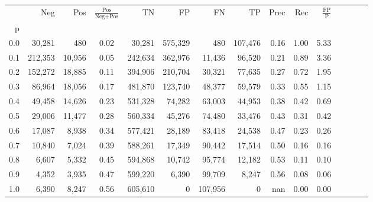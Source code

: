 \begin{tabular}{rrrcrrrrrrrrrrr}
\toprule
{} &      Neg &     Pos & $\frac{\text{Pos}}{\text{Neg}+\text{Pos}}$ &       TN &       FP &       FN &       TP &  Prec &   Rec & $\frac{\text{FP}}{\text{P}}$ \\
p   &          &         &                                            &          &          &          &          &       &       &                              \\
\midrule
0.0 &   30,281 &     480 &                                       0.02 &   30,281 &  575,329 &      480 &  107,476 &  0.16 &  1.00 &                         5.33 \\
0.1 &  212,353 &  10,956 &                                       0.05 &  242,634 &  362,976 &   11,436 &   96,520 &  0.21 &  0.89 &                         3.36 \\
0.2 &  152,272 &  18,885 &                                       0.11 &  394,906 &  210,704 &   30,321 &   77,635 &  0.27 &  0.72 &                         1.95 \\
0.3 &   86,964 &  18,056 &                                       0.17 &  481,870 &  123,740 &   48,377 &   59,579 &  0.33 &  0.55 &                         1.15 \\
0.4 &   49,458 &  14,626 &                                       0.23 &  531,328 &   74,282 &   63,003 &   44,953 &  0.38 &  0.42 &                         0.69 \\
0.5 &   29,006 &  11,477 &                                       0.28 &  560,334 &   45,276 &   74,480 &   33,476 &  0.43 &  0.31 &                         0.42 \\
0.6 &   17,087 &   8,938 &                                       0.34 &  577,421 &   28,189 &   83,418 &   24,538 &  0.47 &  0.23 &                         0.26 \\
0.7 &   10,840 &   7,024 &                                       0.39 &  588,261 &   17,349 &   90,442 &   17,514 &  0.50 &  0.16 &                         0.16 \\
0.8 &    6,607 &   5,332 &                                       0.45 &  594,868 &   10,742 &   95,774 &   12,182 &  0.53 &  0.11 &                         0.10 \\
0.9 &    4,352 &   3,935 &                                       0.47 &  599,220 &    6,390 &   99,709 &    8,247 &  0.56 &  0.08 &                         0.06 \\
1.0 &    6,390 &   8,247 &                                       0.56 &  605,610 &        0 &  107,956 &        0 &   nan &  0.00 &                         0.00 \\
\bottomrule
\end{tabular}
